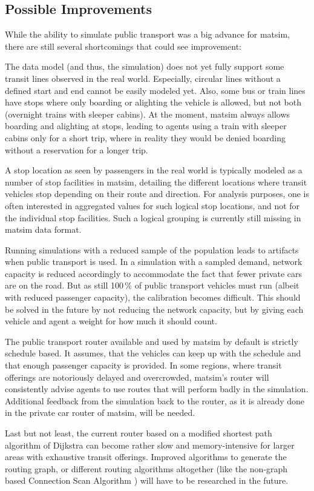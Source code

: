 \subsection{Possible Improvements}
While the ability to simulate public transport was a big advance for \gls{matsim},
there are still several shortcomings that could see improvement:
%
\begin{compactitem}
	\item The data model (and thus, the simulation) does not yet fully support some
	transit lines observed in the real world. Especially, circular lines without a
	defined start and end cannot be easily modeled yet. Also, some bus or
	train lines have stops where only boarding or alighting the vehicle is allowed,
	but not both (\eg overnight trains with sleeper cabins). At the moment, \gls{matsim}
	always allows boarding and alighting at stops, leading to agents \eg using a
	train with sleeper cabins only for a short trip, where in reality they would be
	denied boarding without a reservation for a longer trip.
	\item A stop location as seen by passengers in the real world is
	typically modeled as a number of stop facilities in \gls{matsim}, detailing the
	different locations where transit vehicles stop depending on their route and
	direction. For analysis purposes, one is often interested in aggregated values
	for such logical stop locations, and not for the individual stop facilities.
	Such a logical grouping is currently still missing in \gls{matsim} data format.
	\item Running simulations with a reduced sample of the population leads to
	artifacts when public transport is used. In a simulation with a sampled demand,
	network capacity is reduced accordingly to accommodate the fact that fewer
	private cars are on the road. But as still 100\,\% of public transport vehicles
	must run (albeit with reduced passenger capacity), the calibration becomes
	difficult. This should be solved in the future by not reducing the network
	capacity, but by giving each vehicle and agent a weight for how much it should
	count.
	\item The public transport router available and used by \gls{matsim} by default is
	strictly schedule based. It assumes, that the vehicles can keep up with the
	schedule and that enough passenger capacity is provided. In some regions, where
	transit offerings are notoriously delayed and overcrowded, \gls{matsim}'s router will
	consistently advise agents to use routes that will perform badly in the
	simulation. Additional feedback from the simulation back to the router, as it
	is already done in the private car router of \gls{matsim}, will be needed.
	\item Last but not least, the current router based on a modified shortest path
	algorithm of Dijkstra can become rather slow and memory-intensive for
	larger areas with exhaustive transit offerings. Improved algorithms to generate
	the routing graph, or different routing algorithms altogether (like the
	non-graph based Connection Scan Algorithm
	\citep{DibbeltEtAl_BonifaciEtAl_2013}) will have to be researched in the
	future.
\end{compactitem}

